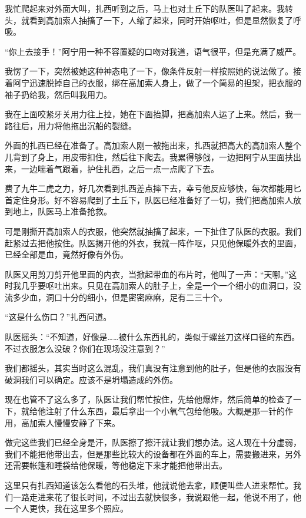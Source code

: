 我忙爬起来对外面大叫，扎西听到之后，马上也对土丘下的队医叫了起来。我转头，就看到高加索人抽搐了一下，人缩了起来，同时开始呕吐，但是显然恢复了呼吸。

“你上去接手！”阿宁用一种不容置疑的口吻对我道，语气很平，但是充满了威严。

我愣了一下，突然被她这种神态电了一下，像条件反射一样按照她的说法做了。接着阿宁迅速脱掉自己的衣服，绑在高加索人身上，做了一个简易的担架，把衣服的袖子扔给我，然后叫我用力。

我在上面咬紧牙关用力往上拉，她在下面抬脚，把高加索人运了上来。然后，我一路往后，用力将他拖出沉船的裂缝。

外面的扎西已经在准备了。高加索人刚一被拖出来，扎西就把高大的高加索人整个儿背到了身上，用皮带扣住，然后往下爬去。我累得够戗，一边把阿宁从里面扶出来，一边喘着气跟着，护住扎西，之后一点一点爬了下去。

费了九牛二虎之力，好几次看到扎西差点摔下去，幸亏他反应够快，每次都能用匕首定住身形。好不容易爬到了土丘下，队医已经准备好了一切，我们把高加索人放到地上，队医马上准备抢救。

可是刚撕开高加索人的衣服，他突然就抽搐了起来，一下扯住了队医的衣服。我们赶紧过去把他按住。队医揭开他的外衣，我就一阵作呕，只见他保暖外衣的里面，已经全部是血，竟然好像有外伤。

队医又用剪刀剪开他里面的内衣，当掀起带血的布片时，他叫了一声：“天哪。”这时我几乎要呕吐出来。只见在高加索人的肚子上，全是一个一个细小的血洞口，没流多少血，洞口十分的细小，但是密密麻麻，足有二三十个。

“这是什么伤口？”扎西问道。

队医摇头：“不知道，好像是……被什么东西扎的，类似于螺丝刀这样口径的东西。不过衣服怎么没破？你们在现场没注意到？”

我们都摇头，其实当时这么混乱，我们真没有注意到他的肚子，但是他的衣服没有破洞我们可以确定。应该不是坍塌造成的外伤。

现在也管不了这么多了，队医让我们帮忙按住，先给他爆炸，然后简单的检查了一下，就给他注射了什么东西，最后拿出一个小氧气包给他吸。大概是那一针的作用，高加索人慢慢安静了下来。

做完这些我们已经全身是汗，队医擦了擦汗就让我们想办法。这人现在十分虚弱，我们不能把他带出去，但是那些比较大的设备都在外面的车上，需要搬进来，另外还需要帐篷和睡袋给他保暖，等他稳定下来才能把他带出去。

这里只有扎西知道该怎么看他的石头堆，他就说他去拿，顺便叫些人进来帮忙。我们一路走进来花了很长时间，不过出去就快很多，我说跟他一起，他说不用了，他一个人更快，我在这里多个照应。

